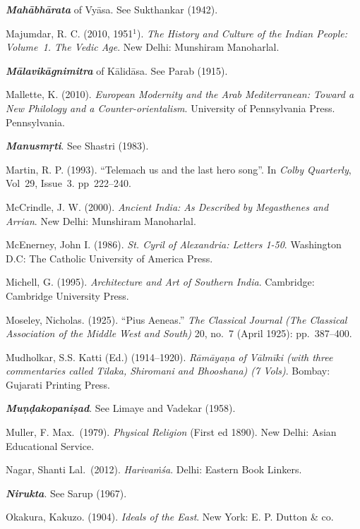\begin{thebibliography}{99}
{\sl\bfseries Mahābhārata} of Vyāsa. See Sukthankar (1942).

Majumdar, R. C. (2010, 1951$^{1}$). {\sl The History and Culture of the Indian People: Volume~1. The Vedic Age}. New Delhi: Munshiram Manoharlal. 

{\sl\bfseries Mālavikāgnimitra} of Kālidāsa. See Parab (1915).

Mallette, K. (2010). {\sl European Modernity and the Arab Mediterranean: Toward a New Philology and a Counter-orientalism}. University of Pennsylvania Press. Pennsylvania.

{\sl\bfseries Manusmṛti}. See Shastri (1983).

Martin, R. P. (1993). “Telemach us and the last hero song”. In {\sl Colby Quarterly}, Vol~29, Issue~3. pp~222--240.

McCrindle, J. W. (2000). {\sl Ancient India: As Described by Megasthenes and Arrian}. New Delhi: Munshiram Manoharlal. 

McEnerney, John I. (1986). {\sl St. Cyril of Alexandria: Letters 1-50}. Washington D.C: The Catholic University of America Press. 

Michell, G. (1995). {\sl Architecture and Art of Southern India}. Cambridge: Cambridge University Press.

Moseley, Nicholas. (1925). “Pius Aeneas.” {\sl The Classical Journal (The Classical Association of the Middle West and South)} 20, no.~7 (April 1925): pp.~387--400.

Mudholkar, S.S. Katti (Ed.) (1914--1920). {\sl Rāmāyaṇa of Vālmīki (with three commentaries called Tilaka,    Shiromani and Bhooshana) (7 Vols)}. Bombay: Gujarati Printing Press. 

{\sl\bfseries Muṇḍakopaniṣad}. See Limaye and Vadekar (1958).

Muller, F. Max.\ (1979). {\sl Physical Religion} (First ed 1890). New Delhi: Asian Educational Service. 

Nagar, Shanti Lal.\ (2012). {\sl Harivaṁśa}. Delhi: Eastern Book Linkers. 

{\sl\bfseries Nirukta}. See Sarup (1967).

Okakura, Kakuzo. (1904). {\sl Ideals of the East}. New York: E. P. Dutton \& co. 


\end{thebibliography}
